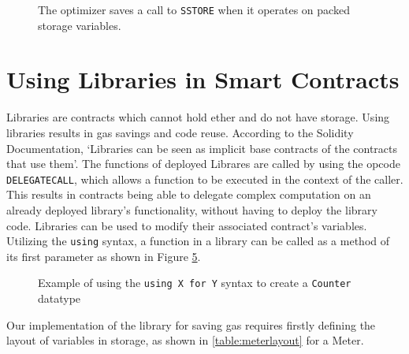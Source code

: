 \begin{figure}[htb]
  \begin{subfigure}[b]{\textwidth}
    \centering
    
    \label{fig:optimizer:a}
  \end{subfigure}

  \begin{subfigure}[b]{\textwidth}
    \centering
    
    \label{fig:optimizer:b}
  \end{subfigure}

  \begin{subfigure}[b]{\textwidth}
    \centering
    
    \label{fig:optimizer:c}
  \end{subfigure}

  \caption{The optimizer saves a call to \texttt{SSTORE} when it operates on packed storage variables.} 
  \label{fig:optimizer}
\end{figure}

\section{Using Libraries in Smart Contracts}

Libraries are contracts which cannot hold ether and do not have storage. Using libraries results in gas savings and code reuse. According to the Solidity Documentation, `Libraries can be seen as implicit base contracts of the contracts that use them'. The functions of deployed Librares are called by using the opcode \texttt{DELEGATECALL}, which allows a function to be executed in the context of the caller. This results in contracts being able to delegate complex computation on an already deployed library's functionality, without having to deploy the library code. Libraries can be used to modify their associated contract's variables. Utilizing the \texttt{using} syntax, a function in a library can be called as a method of its first parameter as shown in Figure \ref{fig:usingfor}.

\begin{figure}[htb]
    \centering
    
    \caption{Example of using the \texttt{using X for Y} syntax to create a \texttt{Counter} datatype~\cite{library}}
    \label{fig:usingfor}
\end{figure}

Our implementation of the library for saving gas requires firstly defining the layout of variables in storage, as shown in \ref{table:meterlayout} for a Meter. 

